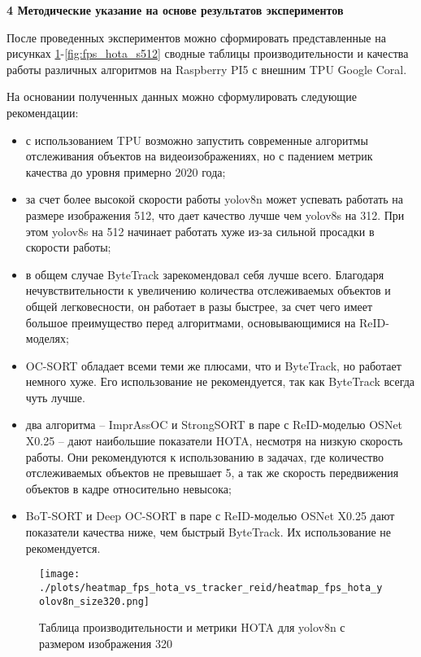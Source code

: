 \newpage
\begin{center}
  \textbf{\large 4 Методические указание на основе результатов экспериментов}
\end{center}
После проведенных экспериментов можно сформировать представленные на рисунках \ref{fig:fps_hota_n320}-\ref{fig:fps_hota_s512} сводные таблицы производительности и качества работы различных алгоритмов на Raspberry PI5 с внешним TPU Google Coral.

На основании полученных данных можно сформулировать следующие рекомендации:
\begin{itemize}
  \item с использованием TPU возможно запустить современные алгоритмы отслеживания объектов на видеоизображениях, но с падением метрик качества до уровня примерно 2020 года;
  \item за счет более высокой скорости работы yolov8n может успевать работать на размере изображения 512, что дает качество лучше чем yolov8s на 312. При этом yolov8s на 512 начинает работать хуже из-за сильной просадки в скорости работы;
  \item в общем случае ByteTrack зарекомендовал себя лучше всего. Благодаря нечувствительности к увеличению количества отслеживаемых объектов и общей легковесности, он работает в разы быстрее, за счет чего имеет большое преимущество перед алгоритмами, основывающимися на ReID-моделях; 
  \item OC-SORT обладает всеми теми же плюсами, что и ByteTrack, но работает немного хуже. Его использование не рекомендуется, так как ByteTrack всегда чуть лучше.
  \item два алгоритма -- ImprAssOC и StrongSORT в паре с ReID-моделью OSNet X0.25 -- дают наибольшие показатели HOTA, несмотря на низкую скорость работы. Они рекомендуются к использованию в задачах, где количество отслеживаемых объектов не превышает 5, а так же скорость передвижения объектов в кадре относительно невысока;
  \item BoT-SORT и Deep OC-SORT в паре с ReID-моделью OSNet X0.25 дают показатели качества ниже, чем быстрый ByteTrack. Их использование не рекомендуется.
\end{itemize}

\begin{figure}[ht]
  \centering
  \texttt{[image: ./plots/heatmap\_fps\_hota\_vs\_tracker\_reid/heatmap\_fps\_hota\_yolov8n\_size320.png]}
  \caption{Таблица производительности и метрики HOTA для yolov8n с размером изображения 320}
  \label{fig:fps_hota_n320}
\end{figure}

